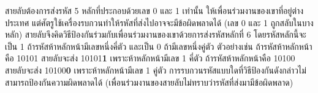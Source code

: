 ﻿%
\question สายลับต้องการส่งรหัส 5 หลักที่ประกอบด้วยเลข 0 และ 1 เท่านั้น ให้เพื่อนร่วมงานของเขาที่อยู่ต่างประเทศ แต่ศัตรูใช้เครื่องรบกวนทำให้รหัสที่ส่งไปอาจจะมีข้อผิดพลาดได้ (เลข 0 และ 1 ถูกสลับในบางหลัก) สายลับจึงคิดวิธีป้องกันร่วมกับเพื่อนร่วมงานของเขาด้วยการส่งรหัสหลักที่ 6 โดยรหัสหลักนี้จะเป็น 1 ถ้ารหัสห้าหลักหน้ามีเลขหนึ่งคี่ตัว และเป็น 0 ถ้ามีเลขหนึ่งคู่ตัว \newline
ตัวอย่างเช่น\newline 
ถ้ารหัสห้าหลักหน้าคือ 10101 สายลับจะส่ง 10101\textbf{1} เพราะห้าหลักหน้ามีเลข 1 คี่ตัว\newline 
ถ้ารหัสห้าหลักหน้าคือ 10100 สายลับจะส่ง 10100\textbf{0} เพราะห้าหลักหน้ามีเลข 1 คู่ตัว\newline
การรบกวนรหัสแบบใดที่วิธีป้องกันดังกล่าวไม่สามารถป้องกันความผิดพลาดได้ (เพื่อนร่วมงานของสายลับไม่ทราบว่ารหัสที่ส่งมามีข้อผิดพลาด)
\newline
{}

